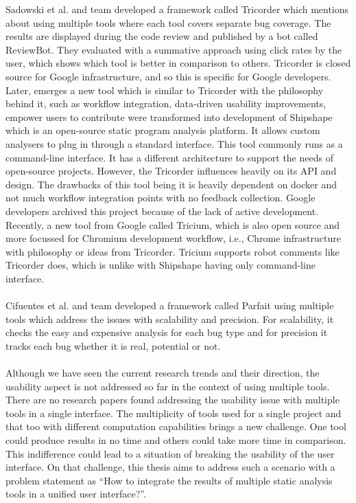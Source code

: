 Sadowski et al. and team developed a framework called Tricorder \cite{tricorder} which mentions about using multiple tools where each tool covers separate bug coverage. The results are displayed during the code review and published by a bot called ReviewBot. They evaluated with a summative approach using click rates by the user, which shows which tool is better in comparison to others. Tricorder is closed source for Google infrastructure, and so this is specific for Google developers. Later, emerges a new tool which is similar to Tricorder with the philosophy behind it, such as workflow integration, data-driven usability improvements, empower users to contribute were transformed into development of Shipshape \cite{shipshape} which is an open-source static program analysis platform. It allows custom analysers to plug in through a standard interface. This tool commonly runs as a command-line interface. It has a different architecture to support the needs of open-source projects. However, the Tricorder influences heavily on its API and design. The drawbacks of this tool being it is heavily dependent on docker and not much workflow integration points with no feedback collection. Google developers archived this project because of the lack of active development. Recently, a new tool from Google called Tricium, \cite{tricium} which is also open source and more focussed for Chromium development workflow, i.e., Chrome infrastructure with philosophy or ideas from Tricorder. Tricium supports robot comments like Tricorder does, which is unlike with Shipshape having only command-line interface. \\ \\

Cifuentes et al. and team developed a framework called Parfait \cite{parfait} using multiple tools which address the issues with scalability and precision. For scalability, it checks the easy and expensive analysis for each bug type and for precision it tracks each bug whether it is real, potential or not. \\ \\

Although we have seen the current research trends and their direction, the usability aspect is not addressed so far in the context of using multiple tools. There are no research papers found addressing the usability issue with multiple tools in a single interface. The multiplicity of tools used for a single project and that too with different computation capabilities brings a new challenge. One tool could produce results in no time and others could take more time in comparison. This indifference could lead to a situation of breaking the usability of the user interface. On that challenge, this thesis aims to address such a scenario with a problem statement as “How to integrate the results of multiple static analysis tools in a unified user interface?”. \\ \\


